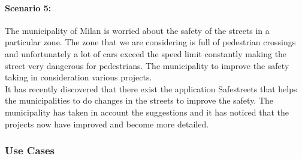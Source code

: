 \documentclass[titlepage]{article}
\begin{document}
\paragraph{Scenario 5:} The municipality of Milan is worried about the safety of the streets in a particular zone. The zone that we are considering is full of pedestrian crossings and unfortunately a lot of cars exceed the speed limit constantly making the street very dangerous for pedestrians. The municipality to improve the safety taking in consideration various projects.\\
It has recently discovered that there exist the application Safestreets that helps the municipalities to do changes in the streets to improve the safety. The municipality has taken in account the suggestions and it has noticed that the projects now have improved and become more detailed.

\subsubsection{Use Cases}
\end{document}
